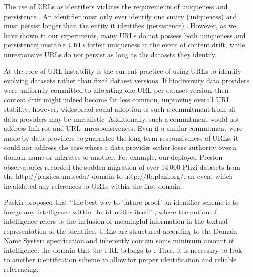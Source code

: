 The use of URLs as identifiers violates the requirements of uniqueness and persistence \citep{Paskin_1999}. An identifier must only ever identify one entity (uniqueness) and must persist longer than the entity it identifies (persistence) \citep{Paskin_1999}. However, as we have shown in our experiments, many URLs do not possess both uniqueness and persistence; unstable URLs forfeit uniqueness in the event of content drift, while unresponsive URLs do not persist as long as the datasets they identify.

At the core of URL instability is the current practice of using URLs to identify evolving datasets rather than fixed dataset versions. If biodiversity data providers were uniformly committed to allocating one URL per dataset version, then content drift might indeed become far less common, improving overall URL stability; however, widespread social adoption of such a commitment from all data providers may be unrealistic. Additionally, such a commitment would not address link rot and URL unresponsiveness. Even if a similar commitment were made by data providers to guarantee the long-term responsiveness of URLs, it could not address the case where a data provider either loses authority over a domain name or migrates to another. For example, our deployed Preston observatories recorded the sudden migration of over 14,000 Plazi datasets from the http://plazi.cs.umb.edu/ domain to http://tb.plazi.org/, an event which invalidated any references to URLs within the first domain.

Paskin proposed that “the best way to ‘future proof’ an identifier scheme is to forego any intelligence within the identifier itself” \citep{Paskin_1999}, where the notion of intelligence refers to the inclusion of meaningful information in the textual representation of the identifier. URLs are structured according to the Domain Name System specification and inherently contain some minimum amount of intelligence: the domain that the URL belongs to \citep{rfc1034}. Thus, it is necessary to look to another identification scheme to allow for proper identification and reliable referencing.

